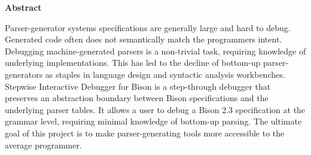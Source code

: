 \thispagestyle{plain}
\begin{center}
    \textbf{Abstract}
\end{center}

Parser-generator systems specifications are generally large and hard to debug. Generated code often does not semantically match the programmers intent. Debugging machine-generated parsers is a non-trivial task, requiring knowledge of underlying implementations. This has led to the decline of bottom-up parser-generators as staples in language design and syntactic analysis workbenches.\\

Stepwise Interactive Debugger for Bison is a step-through debugger that preserves an abstraction boundary between Bison specifications and the underlying parser tables. It allows a user to debug a Bison 2.3 specification at the grammar level, requiring minimal knowledge of bottom-up parsing. The ultimate goal of this project is to make parser-generating tools more accessible to the average programmer.